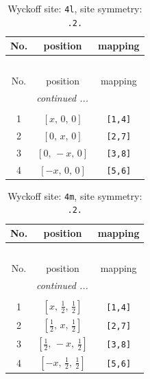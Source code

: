 \documentclass[fleqn,8pt]{jsarticle}
\begin{document}
\renewcommand{\arraystretch}{1.2}
\begin{longtable}{ccc}
\caption{Wyckoff site: {\tt 4l}, site symmetry: {\tt .2.}}
 \\
 \hline \hline
No. & position & mapping \\ \hline \endfirsthead

\multicolumn{2}{l}{\tablename\ \thetable{}} \\
 \hline \hline
No. & position & mapping \\ \hline \endhead

 \hline \hline
\multicolumn{2}{r}{\footnotesize\it continued ...} \\ \endfoot

 \hline \hline
\multicolumn{2}{r}{} \\ \endlastfoot

1 & $\left[ x,\, 0,\, 0 \right]$ & {\tt [1,4]} \\ \hline
2 & $\left[ 0,\, x,\, 0 \right]$ & {\tt [2,7]} \\ \hline
3 & $\left[ 0,\, - x,\, 0 \right]$ & {\tt [3,8]} \\ \hline
4 & $\left[ - x,\, 0,\, 0 \right]$ & {\tt [5,6]} \\
\end{longtable}
\renewcommand{\arraystretch}{1.2}
\begin{longtable}{ccc}
\caption{Wyckoff site: {\tt 4m}, site symmetry: {\tt .2.}}
 \\
 \hline \hline
No. & position & mapping \\ \hline \endfirsthead

\multicolumn{2}{l}{\tablename\ \thetable{}} \\
 \hline \hline
No. & position & mapping \\ \hline \endhead

 \hline \hline
\multicolumn{2}{r}{\footnotesize\it continued ...} \\ \endfoot

 \hline \hline
\multicolumn{2}{r}{} \\ \endlastfoot

1 & $\left[ x,\, \frac{1}{2},\, \frac{1}{2} \right]$ & {\tt [1,4]} \\ \hline
2 & $\left[ \frac{1}{2},\, x,\, \frac{1}{2} \right]$ & {\tt [2,7]} \\ \hline
3 & $\left[ \frac{1}{2},\, - x,\, \frac{1}{2} \right]$ & {\tt [3,8]} \\ \hline
4 & $\left[ - x,\, \frac{1}{2},\, \frac{1}{2} \right]$ & {\tt [5,6]} \\
\end{longtable}
\end{document}
